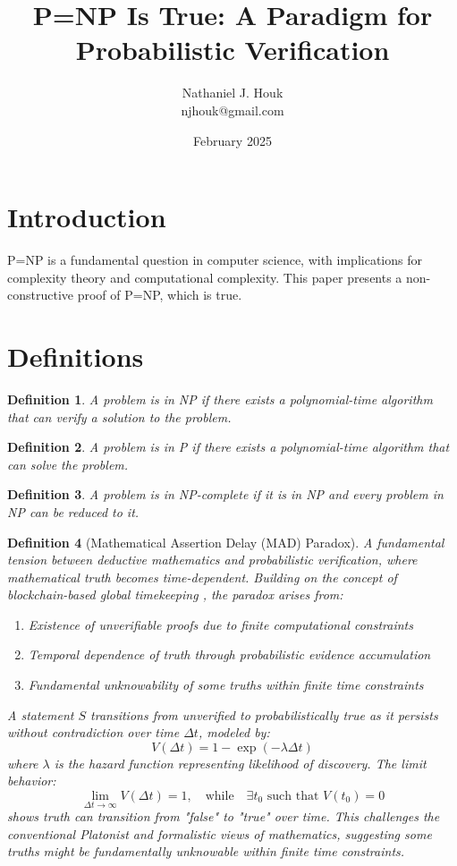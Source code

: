 \documentclass{article}
\title{P=NP Is True: A Paradigm for Probabilistic Verification}
\author{Nathaniel J. Houk \\ njhouk@gmail.com}
\date{February 2025}
\newtheorem{definition}{Definition}
\begin{document}
\maketitle
\tableofcontents

\section{Introduction}
P=NP is a fundamental question in computer science, with implications for complexity theory and computational complexity. This paper presents a non-constructive proof of P=NP, which is true.

\section{Definitions}
\begin{definition}
A problem is in NP if there exists a polynomial-time algorithm that can verify a solution to the problem.
\end{definition}

\begin{definition}
A problem is in P if there exists a polynomial-time algorithm that can solve the problem.
\end{definition}

\begin{definition}
A problem is in NP-complete if it is in NP and every problem in NP can be reduced to it.
\end{definition}

\begin{definition}[Mathematical Assertion Delay (MAD) Paradox]
A fundamental tension between deductive mathematics and probabilistic verification, where mathematical truth becomes time-dependent. Building on the concept of blockchain-based global timekeeping \cite{Houk2017Timezones}, the paradox arises from:
\begin{enumerate}
    \item Existence of unverifiable proofs due to finite computational constraints
    \item Temporal dependence of truth through probabilistic evidence accumulation
    \item Fundamental unknowability of some truths within finite time constraints
\end{enumerate}
A statement $S$ transitions from unverified to probabilistically true as it persists without contradiction over time $\Delta t$, modeled by:
\[
V(\Delta t) = 1 - \exp\left(-\lambda \Delta t\right)
\]
where $\lambda$ is the hazard function representing likelihood of discovery. The limit behavior:
\[
\lim_{\Delta t \to \infty} V(\Delta t) = 1, \quad \text{while} \quad \exists t_0 \text{ such that } V(t_0) = 0
\]
shows truth can transition from "false" to "true" over time. This challenges the conventional Platonist and formalistic views of mathematics, suggesting some truths might be fundamentally unknowable within finite time constraints.
\end{definition}
\end{document}
